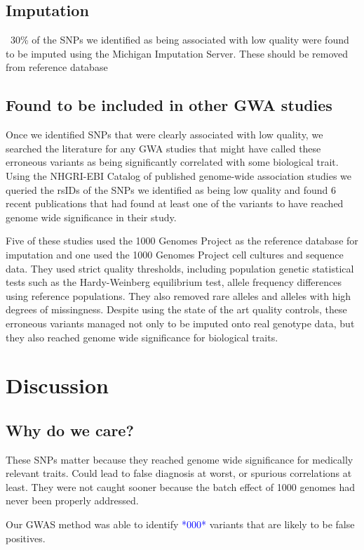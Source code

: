 \documentclass[]{elife}
\newcommand{\todo}[1]{\textcolor{blue}{*#1*}}
\begin{document}
	\subsection{Imputation}
~30\% of the SNPs we identified as being associated with low quality were found to be imputed using the Michigan Imputation Server. These  should be removed from reference database

	\subsection{Found to be included in other GWA studies}
Once we identified SNPs that were clearly associated with low quality, we searched the literature for any GWA studies that might have called these erroneous variants as being significantly correlated with some biological trait. 
Using the NHGRI-EBI Catalog of published genome-wide association studies we queried the rsIDs of the SNPs we identified as being low quality and found 6 recent publications that had found at least one of the variants to have reached genome wide significance in their study. 

Five of these studies used the 1000 Genomes Project as the reference database for imputation and one used the 1000 Genomes Project cell cultures and sequence data. 
They used strict quality thresholds, including population genetic statistical tests such as the Hardy-Weinberg equilibrium test, allele frequency differences using reference populations. 
They also removed rare alleles and alleles with high degrees of missingness. 
Despite using the state of the art quality controls, these erroneous variants managed not only to be imputed onto real genotype data, but they also reached genome wide significance for biological traits. 

			\section{Discussion}
\subsection{Why do we care?}
These SNPs matter because they reached genome wide significance for medically relevant traits. 
Could lead to false diagnosis at worst, or spurious correlations at least. 
They were not caught sooner because the batch effect of 1000 genomes had never been properly addressed. 

Our GWAS method was able to identify \todo{000} variants that are likely to be false positives.
\end{document}
